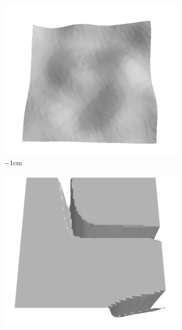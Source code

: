 \documentclass[../document.tex]{subfiles}
\begin{document}
\begin{figure}[htbp] 
    \centering
    \begin{subfigure}[b]{0.19\textwidth}
    \includegraphics[width=\linewidth]{../img/5/train/all/-1-patch-3d-majavi-3.png}
    \caption{$-1$cm}
    \end{subfigure}
    \begin{subfigure}[b]{0.19\textwidth}
    \includegraphics[width=\linewidth]{../img/5/train/all/-3-patch-3d-majavi-2.png}

\end{subfigure}
\end{figure}
\end{document}
